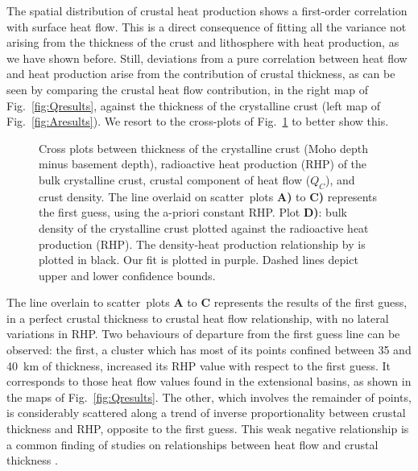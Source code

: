 {The spatial distribution of crustal heat production shows a first-order correlation with surface heat flow.
This is a direct consequence of fitting all the variance not arising from the thickness of the crust and lithosphere with heat production, as we have shown before.
Still, deviations from a pure correlation between heat flow and heat production arise from the contribution of crustal thickness, as can be seen by comparing the crustal heat flow contribution, in the right map of Fig.~\ref{fig:Qresults}, against the thickness of the crystalline crust (left map of Fig.~\ref{fig:Aresults}).
We resort to the cross-plots of Fig.~\ref{fig:Qcrossplots} to better show this.

\begin{figure}
	\begin{adjustbox}{center}
	\end{adjustbox}
	\caption{Cross plots between thickness of the crystalline crust (Moho depth minus basement depth), radioactive heat production (RHP) of the bulk crystalline crust, crustal component of heat flow ($Q_C$), and crust density. The line overlaid on scatter~plots \textbf{A)} to \textbf{C)} represents the first guess, using the a-priori constant RHP.
	Plot \textbf{D)}: bulk density of the crystalline crust plotted against the radioactive heat production (RHP). The density-heat production relationship by \textcite{Hasterok2017_ign} is plotted in black. Our fit is plotted in purple. Dashed lines depict upper and lower confidence bounds.}
	\label{fig:Qcrossplots}
\end{figure}

The line overlain to scatter~plots \textbf{A} to \textbf{C} represents the results of the first guess, in a perfect crustal thickness to crustal heat flow relationship, with no lateral variations in RHP.
Two behaviours of departure from the first guess line can be observed: the first, a cluster which has most of its points confined between 35 and 40~km of thickness, increased its RHP value with respect to the first guess.
It corresponds to those heat flow values found in the extensional basins, as shown in the maps of Fig.~\ref{fig:Qresults}.
The other, which involves the remainder of points, is considerably scattered along a trend of inverse proportionality between crustal thickness and RHP, opposite to the first guess.
This weak negative relationship is a common finding of studies on relationships between heat flow and crustal thickness \parencites{Cermak1993}{Mareschal2013}.

}
